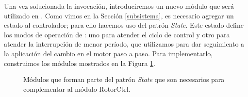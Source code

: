 Una vez solucionada la invocación, introduciremos un nuevo módulo que será utilizado en \RotorCtrl. Como vimos en la Sección \ref{subsistema}, es necesario agregar un estado al controlador; para ello hacemos uso del patrón \textit{State}. Este estado define los modos de operación de \RotorCtrl: uno para atender el ciclo de control y otro para atender la interrupción de menor período, que utilizamos para dar seguimiento a la aplicación del cambio en el motor paso a paso. Para implementarlo, construimos los módulos mostrados en la Figura \ref{operationState}.

\begin{figure}[H]
\caption{Módulos que forman parte del patrón \textit{State} que son necesarios para complementar al módulo RotorCtrl.}
\label{operationState}
\begin{center}
\end{center}
\end{figure}

